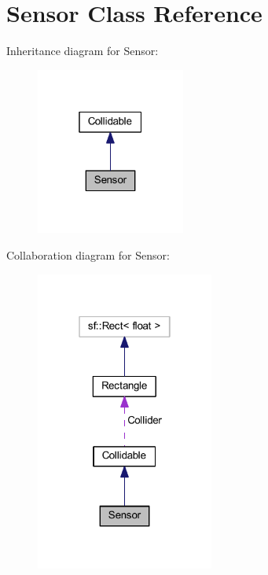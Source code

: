 \hypertarget{class_sensor}{\section{Sensor Class Reference}
\label{class_sensor}
}


Inheritance diagram for Sensor\-:\nopagebreak
\begin{figure}[H]
\begin{center}
\leavevmode
\includegraphics[width=139pt]{class_sensor__inherit__graph}
\end{center}
\end{figure}


Collaboration diagram for Sensor\-:\nopagebreak
\begin{figure}[H]
\begin{center}
\leavevmode
\includegraphics[width=166pt]{class_sensor__coll__graph}
\end{center}
\end{figure}
